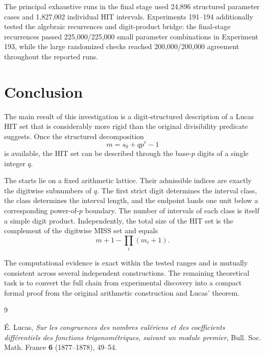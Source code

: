 \documentclass[11pt,a4paper]{article}
\theoremstyle{definition}
\theoremstyle{remark}
\begin{document}
The principal exhaustive runs in the final stage used 24,896 structured parameter cases and 1,827,002 individual HIT intervals. Experiments 191--194 additionally tested the algebraic recurrences and digit-product bridge: the final-stage recurrences passed 225,000/225,000 small parameter combinations in Experiment 193, while the large randomized checks reached 200,000/200,000 agreement throughout the reported runs.

\section{Conclusion}

The main result of this investigation is a digit-structured description of a Lucas HIT set that is considerably more rigid than the original divisibility predicate suggests.  Once the structured decomposition
\[
 m=s_0+qp^e-1
\]
is available, the HIT set can be described through the base-$p$ digits of a single integer $q$.

The starts lie on a fixed arithmetic lattice.  Their admissible indices are exactly the digitwise subnumbers of $q$.  The first strict digit determines the interval class, the class determines the interval length, and the endpoint lands one unit below a corresponding power-of-$p$ boundary.  The number of intervals of each class is itself a simple digit product.  Independently, the total size of the HIT set is the complement of the digitwise MISS set and equals
\[
 m+1-\prod_i(m_i+1).
\]

The computational evidence is exact within the tested ranges and is mutually consistent across several independent constructions.  The remaining theoretical task is to convert the full chain from experimental discovery into a compact formal proof from the original arithmetic construction and Lucas' theorem.

\begin{thebibliography}{9}

É. Lucas,
\emph{Sur les congruences des nombres eulériens et des coefficients différentiels des fonctions trigonométriques, suivant un module premier},
Bull. Soc. Math. France \textbf{6} (1877--1878), 49--54.

\end{thebibliography}
\end{document}
